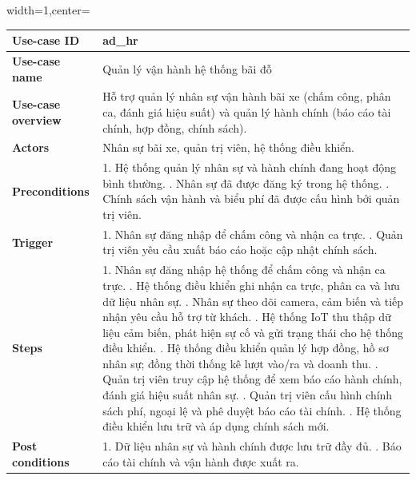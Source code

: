 \begin{adjustbox}{width=1\textwidth,center=\textwidth}
\small
\begin{tabular}{|>{\centering\arraybackslash}m{3.5cm}|m{13.2cm}|}
\hline
\textbf{Use-case ID} & ad\_hr \\ \hline
\textbf{Use-case name} & Quản lý vận hành hệ thống bãi đỗ \\ \hline
\textbf{Use-case overview} & Hỗ trợ quản lý nhân sự vận hành bãi xe (chấm công, phân ca, đánh giá hiệu suất) và quản lý hành chính (báo cáo tài chính, hợp đồng, chính sách). \\ \hline
\textbf{Actors} & Nhân sự bãi xe, quản trị viên, hệ thống điều khiển. \\ \hline
\textbf{Preconditions} & 
1. Hệ thống quản lý nhân sự và hành chính đang hoạt động bình thường. \newline
2. Nhân sự đã được đăng ký trong hệ thống. \newline
3. Chính sách vận hành và biểu phí đã được cấu hình bởi quản trị viên. \\ \hline
\textbf{Trigger} & 
1. Nhân sự đăng nhập để chấm công và nhận ca trực. \newline
2. Quản trị viên yêu cầu xuất báo cáo hoặc cập nhật chính sách. \\ \hline
\textbf{Steps} & 
1. Nhân sự đăng nhập hệ thống để chấm công và nhận ca trực. \newline
2. Hệ thống điều khiển ghi nhận ca trực, phân ca và lưu dữ liệu nhân sự. \newline
3. Nhân sự theo dõi camera, cảm biến và tiếp nhận yêu cầu hỗ trợ từ khách. \newline
4. Hệ thống IoT thu thập dữ liệu cảm biến, phát hiện sự cố và gửi trạng thái cho hệ thống điều khiển. \newline
5. Hệ thống điều khiển quản lý hợp đồng, hồ sơ nhân sự; đồng thời thống kê lượt vào/ra và doanh thu. \newline
6. Quản trị viên truy cập hệ thống để xem báo cáo hành chính, đánh giá hiệu suất nhân sự. \newline
7. Quản trị viên cấu hình chính sách phí, ngoại lệ và phê duyệt báo cáo tài chính. \newline
8. Hệ thống điều khiển lưu trữ và áp dụng chính sách mới. \\ \hline
\textbf{Post conditions} & 
1. Dữ liệu nhân sự và hành chính được lưu trữ đầy đủ. \newline
2. Báo cáo tài chính và vận hành được xuất ra. \newline

\end{tabular}
\end{adjustbox}
